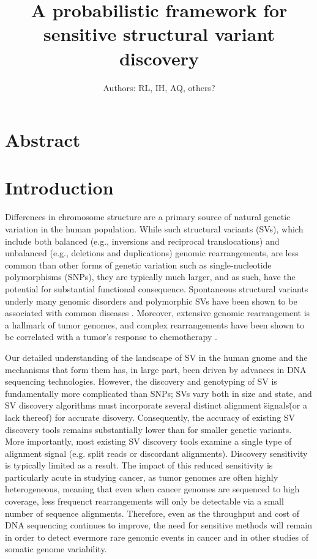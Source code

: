 \documentclass[11pt]{article}
\begin{document}
\title{A probabilistic framework for sensitive structural variant discovery}
\author{Authors: RL, IH, AQ, others?}
\maketitle


\section{Abstract}



\section{Introduction}

Differences in chromosome structure are a primary source of natural 
genetic variation in the human population. While such structural variants (SVs),
which include both balanced (e.g., inversions and reciprocal translocations)
and unbalanced (e.g., deletions and duplications) genomic rearrangements, are 
less common than other forms of genetic variation such as single-nucleotide 
polymorphisms (SNPs), they are typically much larger, and as such, have the 
potential for substantial functional consequence. Spontaneous structural
variants underly many genomic disorders and polymorphic SVs have been shown to
be associated with common diseases \cite{McCarroll2008}. Moreover, extensive
genomic rearrangement is a hallmark of tumor genomes, and complex rearrangements
have been shown to be correlated with a tumor's response to chemotherapy
\cite{Rausch2012}.

Our detailed understanding of the landscape of SV in the human gnome and the
mechanisms that form them has, in large part, been driven by advances in DNA
sequencing technologies. However, the discovery and genotyping of SV is 
fundamentally more complicated than SNPs; SVs vary both in size and state, 
and SV  discovery algorithms must incorporate several distinct alignment 
\"signals\" (or a lack thereof) for accurate disovery. Consequently, the
accuracy of existing SV discovery tools remains substantially lower than for
smaller genetic variants. More importantly, most existing SV discovery
tools examine a single type of alignment signal (e.g. split reads or discordant
alignments). Discovery sensitivity is typically limited as a result. The
impact of this reduced sensitivity is particularly acute in studying cancer,
as tumor genomes are often highly heterogeneous, meaning that even when cancer
genomes are sequenced to high coverage, less frequenct rearrangements will
only be detectable via a small number of sequence alignments. Therefore,
even as the throughput and cost of DNA sequencing continues to improve, the
need for sensitive methods will remain in order to detect evermore rare
genomic events in cancer and in other studies of somatic genome variability.
\end{document}

